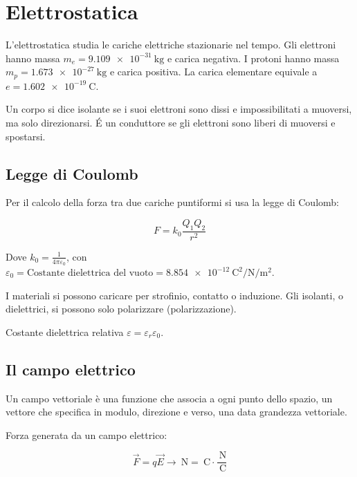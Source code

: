 
\section{Elettrostatica}

L'elettrostatica studia le cariche elettriche stazionarie nel tempo.
Gli elettroni hanno massa $m_e = \SI{9.109e-31}{\kilo\gram}$ e carica negativa.
I protoni hanno massa $m_p = \SI{1.673e-27}{\kilo\gram}$ e carica positiva.
La carica elementare equivale a $e = \SI{1.602e-19}{\coulomb}$.

Un corpo si dice isolante se i suoi elettroni sono dissi e impossibilitati a muoversi, ma solo direzionarsi.
É un conduttore se gli elettroni sono liberi di muoversi e spostarsi.

\subsection{Legge di Coulomb}

Per il calcolo della forza tra due cariche puntiformi si usa la legge di Coulomb:

\begin{equation*}
    F = k_0 \frac{Q_1 Q_2}{r^2}
\end{equation*}

Dove $k_0 = \frac{1}{4\pi\varepsilon_0}$, con $\varepsilon_0 = \text{Costante dielettrica del vuoto} = \SI{8.854e-12}{\coulomb\squared\per\newton\per\meter\squared}$.

I materiali si possono caricare per strofinio, contatto o induzione. Gli isolanti, o dielettrici, si possono solo polarizzare (polarizzazione).

Costante dielettrica relativa $\varepsilon = \varepsilon_r \varepsilon_0$.

\subsection{Il campo elettrico}

Un campo vettoriale è una funzione che associa a ogni punto dello spazio, un vettore che specifica in modulo, direzione e verso, una data grandezza vettoriale.

Forza generata da un campo elettrico:

\begin{equation*}
    \vec{F} = q \vec{E} \rightarrow \SI{}{\newton} = \SI{}{\coulomb} \cdot \frac{\SI{}{\newton}}{\SI{}{\coulomb}}
\end{equation*}

